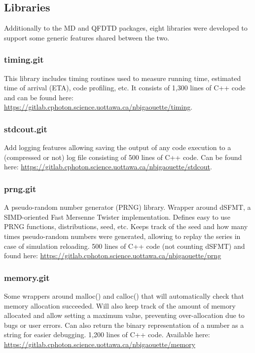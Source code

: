 \subsection{Libraries}
\label{section:tools:libraries}

Additionally to the MD and QFDTD packages, eight libraries were developed to
support some generic features shared between the two.

\subsubsection{timing.git} \label{section:tools:libraries:timing}
This library includes timing routines used to measure running time, estimated
time of arrival (ETA), code profiling, etc. It consists of 1,300 lines of C++
code and can be found here:
\url{https://gitlab.cphoton.science.uottawa.ca/nbigaouette/timing}.

\subsubsection{stdcout.git} \label{section:tools:libraries:stdcout}
Add logging features allowing saving the output of any code execution to a
(compressed or not) log file consisting of 500 lines of C++ code.
Can be found here:
\url{https://gitlab.cphoton.science.uottawa.ca/nbigaouette/stdcout}.

\subsubsection{prng.git} \label{section:tools:libraries:prng}
A pseudo-random number generator (PRNG) library. Wrapper around
dSFMT\cite{prng2009}, a SIMD-oriented Fast Mersenne Twister implementation.
Defines easy to use PRNG functions, distributions, seed, etc. Keeps track of
the seed and how many times pseudo-random numbers were generated, allowing
to replay the series in case of simulation reloading. 500 lines of C++ code
(not counting dSFMT) and found here:
\url{https://gitlab.cphoton.science.uottawa.ca/nbigaouette/prng}

\subsubsection{memory.git} \label{section:tools:libraries:memory}
Some wrappers around malloc() and calloc() that will automatically check that
memory allocation succeeded. Will also keep track of the amount of
memory allocated and allow setting a maximum value, preventing
over-allocation due to bugs or user errors. Can also return the binary
representation of a number as a string for easier debugging. 1,200 lines of
C++ code. Available here:
\url{https://gitlab.cphoton.science.uottawa.ca/nbigaouette/memory}

